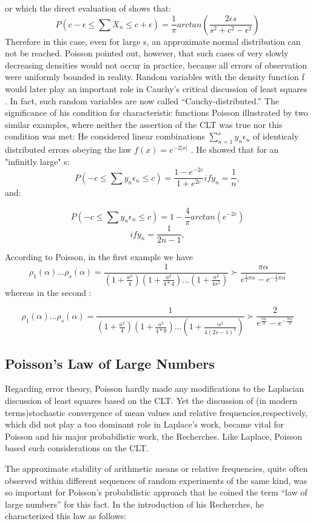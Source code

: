 \documentclass{article}
\begin{document}
or which the direct evaluation of  shows that:
\[P(c-\epsilon \leq \sum X_n \leq c+\epsilon ) = \frac{1}{\pi} arctan (\frac{2\epsilon s }{s^2 +c^2-\epsilon^2})\]
Therefore in this case, even for large s, an approximate normal distribution can
not be reached. Poisson \cite{Dodge2008Concise} pointed out, however, that such cases of very
slowly decreasing densities would not occur in practice, because all errors of observation were uniformly bounded in reality. Random variables with the density function f would later play an important role in Cauchy’s critical discussion of least squares . In fact, such random variables are now called “Cauchy-distributed.”
The significance of his condition for characteristic functions  Poisson illustrated by two similar examples, where neither the assertion
of the CLT was true nor this condition was met: He considered linear combinations $\sum_{n=1}^s y_n \epsilon_n$ of identicaly distributed errors obeying the law 
$f(x)= e^{-2|x|}$ . He showed that for an "infinitly large" s:
\[P(-c \leq \sum y_n \epsilon_n \leq c)  = \frac{1-e^{-2c}}{1+e^{2c}} if y_n = \frac{1}{n}, \]and: 

\[P(-c \leq \sum y_n \epsilon_n \leq c)  = 1- \frac{4}{\pi}arctan(e^{-2c})  \]\[ if    y_n = \frac{1}{2n-1}, \] 

According to Poisson, in the first example we have
\[   \rho_1(\alpha)...\rho_s(\alpha)= \frac{1}{(1+\frac{a^2}{4})(1+\frac{a^2}{4*4})...(1+\frac{\alpha^2}{4s^2})} \succ \frac{\pi \alpha}{e^{\frac{1}{2}\pi \alpha} -e^{-\frac{1}{2} \pi \alpha}}  \]
whereas in the second :

\[   \rho_1(\alpha)...\rho_s(\alpha) = \frac{1}{(1+\frac{a^2}{4})(1+\frac{a^2}{4*9})...(1+\frac{\alpha^2}{4 (2s-1)^2})} \succ \frac{2}{e^{\frac{\pi \alpha}{4}} -e^{-\frac{\pi \alpha}{4}}}  \]
\subsection{ Poisson’s Law of Large Numbers}
Regarding error theory, Poisson hardly made any modifications to the Laplacian
discussion of least squares based on the CLT. Yet the discussion of (in modern terms)stochastic convergence of mean values and relative frequencies,respectively, which did not play a too dominant role in Laplace’s work, became vital for Poisson and his major probabilistic work, the Recherches. Like Laplace, Poisson based such considerations on the CLT.

The approximate stability of arithmetic means or relative frequencies, quite often
observed within different sequences of random experiments of the same kind, was
so important for Poisson’s probabilistic approach that he coined the term “law of
large numbers” for this fact. In the introduction of his Recherches, he characterized this law as follows:
\end{document}
